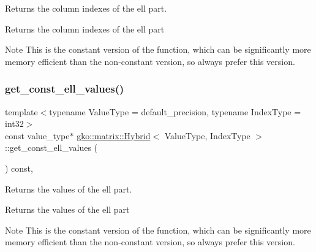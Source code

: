 Returns the column indexes of the ell part. 

\begin{DoxyReturn}{Returns}
the column indexes of the ell part
\end{DoxyReturn}
\begin{DoxyNote}{Note}
This is the constant version of the function, which can be significantly more memory efficient than the non-\/constant version, so always prefer this version. 
\end{DoxyNote}
\mbox{\label{classgko_1_1matrix_1_1Hybrid_af792e702c3650f4e77e8cb256250f21e}} 
\subsubsection{\texorpdfstring{get\+\_\+const\+\_\+ell\+\_\+values()}{get\_const\_ell\_values()}}
{\footnotesize\ttfamily template$<$typename Value\+Type = default\+\_\+precision, typename Index\+Type = int32$>$ \\
const value\+\_\+type$\ast$ \hyperlink{classgko_1_1matrix_1_1Hybrid}{gko\+::matrix\+::\+Hybrid}$<$ Value\+Type, Index\+Type $>$\+::get\+\_\+const\+\_\+ell\+\_\+values (\begin{DoxyParamCaption}{ }\end{DoxyParamCaption}) const\hspace{0.3cm}{\ttfamily [inline]}, {\ttfamily [noexcept]}}



Returns the values of the ell part. 

\begin{DoxyReturn}{Returns}
the values of the ell part
\end{DoxyReturn}
\begin{DoxyNote}{Note}
This is the constant version of the function, which can be significantly more memory efficient than the non-\/constant version, so always prefer this version. 
\end{DoxyNote}
\mbox{\label{classgko_1_1matrix_1_1Hybrid_a80eb99775093553db1029b9675f34e2c}} 
